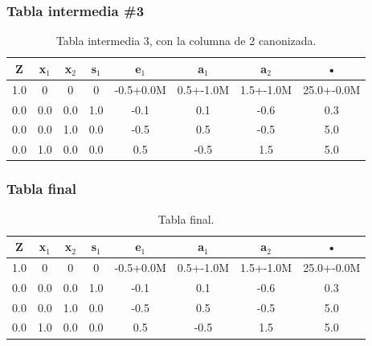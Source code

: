 \documentclass{beamer}
\begin{document}
 
\begin{frame}  
\frametitle{Tabla intermedia \#3} 
\begin{table}[H] 
\begin{center} 
\begin{tabular}{|*{8}{c|}} 
\hline 
\textbf{Z}  & \cellcolor{color_columna_candidata}\textcolor{color_blanco}{\textbf{x$_{1}$}} & \textbf{x$_{2}$} & \textbf{s$_{1}$} & \textbf{e$_{1}$} & \textbf{a$_{1}$} & \textbf{a$_{2}$} & \textbf{•} \\\hline \hline 
1.0 & \cellcolor{color_columna_candidata}\textcolor{color_blanco}{0} & 0 & 0 & -0.5+0.0M & 0.5+-1.0M & 1.5+-1.0M & 25.0+-0.0M \\\hline 
0.0 & \cellcolor{color_columna_candidata}\textcolor{color_blanco}{0.0} & 0.0 & 1.0 & -0.1 & 0.1 & -0.6 & 0.3\\ 
\hline 
0.0 & \cellcolor{color_columna_candidata}\textcolor{color_blanco}{0.0} & 1.0 & 0.0 & -0.5 & 0.5 & -0.5 & 5.0\\ 
\hline 
0.0 & \cellcolor{color_columna_candidata}\textcolor{color_blanco}{1.0} & 0.0 & 0.0 & 0.5 & -0.5 & 1.5 & 5.0\\ 
\hline 
\end{tabular} 
\caption{Tabla intermedia 3, con la columna de 2 canonizada.} 
\end{center} 
\end{table} 
\end{frame} 
 
 
\begin{frame}  
\frametitle{Tabla final} 
\begin{table}[H] 
\begin{center} 
\begin{tabular}{|*{8}{c|}} 
\hline 
\textbf{Z}  & \textbf{x$_{1}$} & \textbf{x$_{2}$} & \textbf{s$_{1}$} & \textbf{e$_{1}$} & \textbf{a$_{1}$} & \textbf{a$_{2}$} & \textbf{•} \\\hline \hline 
1.0 & 0 & 0 & 0 & -0.5+0.0M & 0.5+-1.0M & 1.5+-1.0M & 25.0+-0.0M \\\hline 
0.0 & 0.0 & 0.0 & 1.0 & -0.1 & 0.1 & -0.6 & 0.3\\ 
\hline 
0.0 & 0.0 & 1.0 & 0.0 & -0.5 & 0.5 & -0.5 & 5.0\\ 
\hline 
0.0 & 1.0 & 0.0 & 0.0 & 0.5 & -0.5 & 1.5 & 5.0\\ 
\hline 
\end{tabular} 
\caption{Tabla final.} 
\end{center} 
\end{table} 
\end{frame} 
 
\end{document}
